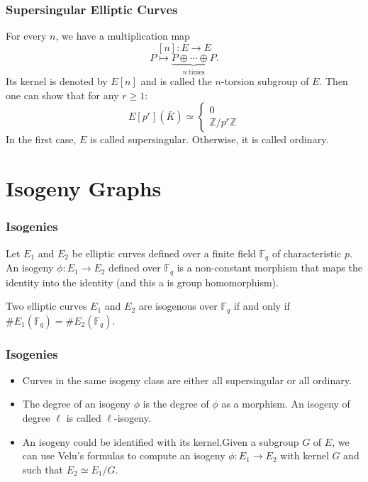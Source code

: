 \documentclass{beamer}
\begin{document}
\begin{frame}
\frametitle{Supersingular Elliptic Curves}
	\begin{definition}
		For every $n$, we have a multiplication map 
			\[[n]: E \to E\]
			\[ P \mapsto \underbrace{P \oplus \cdots \oplus P}_{n \ \text{times}}. \]
		Its kernel is denoted by $E[n]$ and is called the $n$-torsion subgroup of $E$. Then one can show that for any $r \geq 1$:
			\[ E[p^r](\bar{K}) \simeq
				\begin{cases}
					{0} \\
					\mathbb{Z}/p^r\mathbb{Z}
				\end{cases} \]
		In the first case, $E$ is called \alert{supersingular}. Otherwise, it is called ordinary.
	\end{definition}
\end{frame}

\section{Isogeny Graphs}

\begin{frame}
\frametitle{Isogenies}
	\begin{definition}
		Let $E_1$ and $E_2$ be elliptic curves defined over a finite field $\mathbb{F}_q$ of characteristic $p$. An \alert{isogeny} $\phi: E_1 \to E_2$ defined over $\mathbb{F}_q$ is a non-constant morphism that maps the identity into the identity (and this a is group homomorphism).
	\end{definition}
	
	\begin{theorem}
		Two elliptic curves $E_1$ and $E_2$ are isogenous over $\mathbb{F}_q$ if and only if $\#E_1(\mathbb{F}_q) = \#E_2(\mathbb{F}_q)$. 
	\end{theorem}

\end{frame}
\begin{frame}
\frametitle{Isogenies}
	\begin{itemize}
		\item Curves in the same isogeny class are either all supersingular or all ordinary.
		
		\item The degree of an isogeny $\phi$ is the degree of $\phi$ as a morphism. An isogeny of degree $\ell$ is called $\ell$-isogeny.
		
		\item \alert{An isogeny could be identified with its kernel}.Given a subgroup $G$ of $E$, we can use Velu's formulas to compute an isogeny $\phi: E_1 \to E_2$ with kernel $G$ and such that $E_2 \simeq E_1/G$.
	\end{itemize}
\end{frame}
\end{document}
